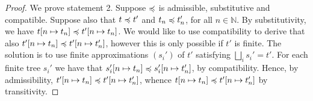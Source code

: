 \begin{proof}
We prove statement 2.
%
            Suppose $\preccurlyeq$ is admissible, substitutive and compatible. 
            Suppose also that $t \preccurlyeq t'$ and $t_n \preccurlyeq t_n'$, for all $n \in \mathbb{N}$.
            By substitutivity, we have $t[n \mapsto t_n] \preccurlyeq t'[n \mapsto t_n]$.
             We would like to use compatibility to derive 
            that also $t'[n \mapsto t_n] \preccurlyeq t'[n \mapsto
            t_n']$, however this is only possible if $t'$ is finite. 
            The solution is to use finite approximations $(s_i')$ of $t'$
            satisfying $\bigsqcup_i s_i' = t'$. For each finite tree $s_i'$
            we have that $s_i'[n \mapsto t_n] \preccurlyeq s_i'[n \mapsto t_n']$, by compatibility.
            Hence, by admissibility, $t'[n \mapsto t_n] \preccurlyeq t'[n \mapsto
            t_n']$, whence $t[n \mapsto t_n] \preccurlyeq t'[n \mapsto t_n']$ by transitivity.
\end{proof}


